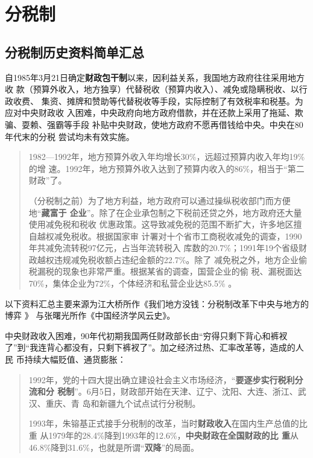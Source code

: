 
\section{分税制}


\subsection{分税制历史资料简单汇总}

自1985年3月21日确定\textbf{财政包干制}以来，因利益关系，我国地方政府往往采用地方收
款（预算外收入，地方独享）代替税收（预算内收入）、减免或隐瞒税收、以行政收费、
集资、摊牌和赞助等代替税收等手段，实际控制了有效税率和税基。为应对中央财政收
入困难，中央政府向地方政府借款，并在还款上采用了拖延、欺骗、耍赖、强霸等手段
补贴中央财政，使地方政府不愿再借钱给中央。\cite{majuncaigai}中央在80年代末的分税
尝试均未有效实施。

\begin{quotation}
  1982—1992年，地方预算外收入年均增长30\%，远超过预算内收入年均19\%的增
  速。1992年，地方预算外收入达到了预算内收入的86\%，相当于“第二财政”了。\cite{zhishenshinei}

  （分税制之前）为了地方利益，地方政府可以通过操纵税收部门而方便地“\textbf{藏富于
    企业}”。除了在企业承包制之下税前还贷之外，地方政府还大量使用减免税和税收
  优惠政策。这导致减免税的范围不断扩大，许多地区擅自越权减免税收。根据国家审
  计署对十个省市工商税收减免的调查，1990年共减免流转税97亿元，占当年流转税入
  库数的20.7\%；1991年19个省级财政越权违规减免税收额占违纪金额的22.7\%。除了
  减免税之外，地方企业偷税漏税的现象也非常严重。根据某省的调查，国营企业的偷
  税、漏税面达70\%，集体企业为72\%，个体经济和私营企业达85.5\% 。\cite{yangdi}
\end{quotation}


以下资料汇总主要来源为江大桥所作《我们地方没钱：分税制改革下中央与地方的博弈 》
\cite{difangmeiqian}与张曙光所作《中国经济学风云史》。

中央财政收入困难，90年代初期我国两任财政部长由“穷得只剩下背心和裤衩
了”到“我连背心都没有，只剩下裤衩了”。加之经济过热、汇率改革等，造成的人民
币持续大幅贬值、通货膨胀：

\begin{quotation}
  1992年，党的十四大提出确立建设社会主义市场经济，“\textbf{要逐步实行税利分流和分
    税制}”。6月5日，财政部开始在天津、辽宁、沈阳、大连、浙江、武汉、重庆、青
  岛和新疆九个试点试行分税制。

  1993年，朱镕基正式接手分税制的改革，当时\textbf{财政收入}在国内生产总值的比重
  从1979年的28.4\%降到1993年的12.6\%，\textbf{中央财政在全国财政的比
    重}从46.8\%降到31.6\%，也就是所谓“\textbf{双降}”的局面。
\end{quotation}

